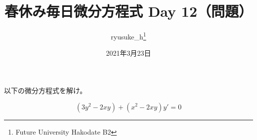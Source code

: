 \documentclass[a4j]{jsarticle}
\title{春休み毎日微分方程式 Day 12（問題）}
\author{ryusuke\_h\thanks{Future University Hakodate B2}}
\date{2021年3月23日}
\begin{document}
\begin{spacing}{1.6}
\maketitle

以下の微分方程式を解け。
\begin{qparts}
  \qpart
  \begin{equation*}
      (3y^2 - 2xy) + (x^2-2xy)y' = 0
  \end{equation*}
  \end{qparts}
\end{spacing}
\end{document}

